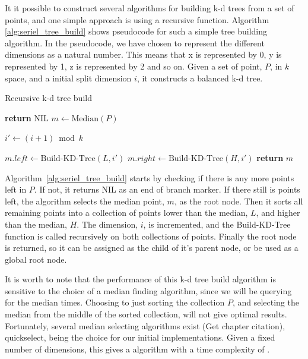 It it possible to construct several algorithms for building k-d trees from a set of points, and one simple approach is using a recursive function. Algorithm \ref{alg:seriel_tree_build} shows pseudocode for such a simple tree building algorithm. In the pseudocode, we have chosen to represent the different dimensions as a natural number. This means that x is represented by 0, y is represented by 1, z is represented by 2 and so on. Given a set of point, $P$, in $k$ space, and a initial split dimension $i$, it constructs a balanced k-d tree.

\begin{algorithm}
\caption{Recursive k-d tree build}
\label{alg:seriel_tree_build}
\begin{algorithmic}
         
            \State \textbf{return} NIL
        \Else
            \State $m \gets \text{Median}(P)$

            \State {}
            \State {}

            \State $i' \gets (i + 1) \bmod k$ 

            \State $m.left \gets \text{Build-KD-Tree}(L, i')$
            \State $m.right \gets \text{Build-KD-Tree}(H, i')$
        \EndIf
        \State \textbf{return} $m$
    \EndFunction
\end{algorithmic}
\end{algorithm}

Algorithm~\ref{alg:seriel_tree_build} starts by checking if there is any more points left in $P$. If not, it returns NIL as an end of branch marker. If there still is points left, the algorithm selects the median point, $m$, as the root node. Then it sorts all remaining points into a collection of points lower than the median, $L$, and higher than the median, $H$. The dimension, $i$, is incremented, and the Build-KD-Tree function is called recursively on both collections of points. Finally the root node is returned, so it can be assigned as the child of it's parent node, or be used as a global root node.

It is worth to note that the performance of this k-d tree build algorithm is sensitive to the choice of a median finding algorithm, since we will be querying for the median  times. Choosing to just sorting the collection $P$, and selecting the median from the middle of the sorted collection, will not give optimal results. Fortunately, several  median selecting algorithms exist\cite{Cormen:2001} (Get chapter citation), quickselect, being the choice for our initial implementations. Given a fixed number of dimensions, this gives a algorithm with a time complexity of \cite{Friedman:1977}.

